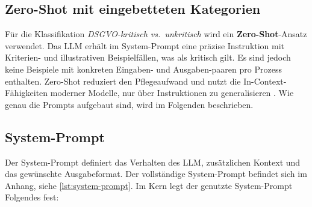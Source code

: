 \subsection*{Zero-Shot mit eingebetteten Kategorien}

Für die Klassifikation \emph{\ac{DSGVO}-kritisch vs.\ unkritisch} wird ein \textbf{Zero-Shot}-Ansatz verwendet. Das \ac{LLM} erhält im System-Prompt eine präzise Instruktion mit Kriterien- und illustrativen Beispielfällen, was als kritisch gilt. Es sind jedoch keine Beispiele mit konkreten Eingaben- und Ausgaben-paaren pro Prozess enthalten. Zero-Shot reduziert den Pflegeaufwand und nutzt die In-Context-Fähigkeiten moderner Modelle, nur über Instruktionen zu generalisieren \cite{brown2020fewshot,liu2023prompting}. Wie genau die Prompts aufgebaut sind, wird im Folgenden beschrieben.

\subsection*{System-Prompt}

Der System-Prompt definiert das Verhalten des \ac{LLM}, zusätzlichen Kontext und das gewünschte Ausgabeformat. Der vollständige System-Prompt befindet sich im Anhang, siehe \ref{lst:system-prompt}. Im Kern legt der genutzte System-Prompt Folgendes fest:

